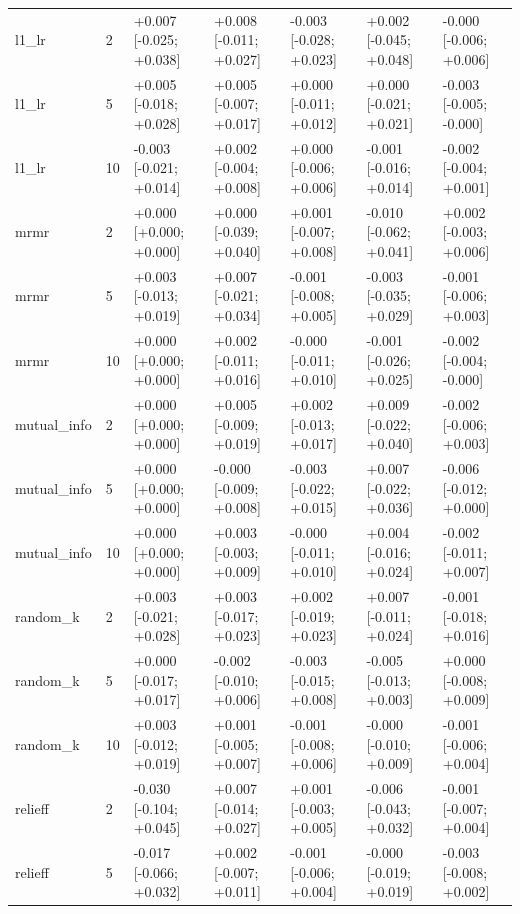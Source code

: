 \begin{table}[t]
\begin{tabular}{lllllll}
    l1\_lr & 2 & +0.007 [-0.025; +0.038] & +0.008 [-0.011; +0.027] & -0.003 [-0.028; +0.023] & +0.002 [-0.045; +0.048] & -0.000 [-0.006; +0.006] \\
    l1\_lr & 5 & +0.005 [-0.018; +0.028] & +0.005 [-0.007; +0.017] & +0.000 [-0.011; +0.012] & +0.000 [-0.021; +0.021] & -0.003 [-0.005; -0.000] \\
    l1\_lr & 10 & -0.003 [-0.021; +0.014] & +0.002 [-0.004; +0.008] & +0.000 [-0.006; +0.006] & -0.001 [-0.016; +0.014] & -0.002 [-0.004; +0.001] \\
    mrmr & 2 & +0.000 [+0.000; +0.000] & +0.000 [-0.039; +0.040] & +0.001 [-0.007; +0.008] & -0.010 [-0.062; +0.041] & +0.002 [-0.003; +0.006] \\
    mrmr & 5 & +0.003 [-0.013; +0.019] & +0.007 [-0.021; +0.034] & -0.001 [-0.008; +0.005] & -0.003 [-0.035; +0.029] & -0.001 [-0.006; +0.003] \\
    mrmr & 10 & +0.000 [+0.000; +0.000] & +0.002 [-0.011; +0.016] & -0.000 [-0.011; +0.010] & -0.001 [-0.026; +0.025] & -0.002 [-0.004; -0.000] \\
    mutual\_info & 2 & +0.000 [+0.000; +0.000] & +0.005 [-0.009; +0.019] & +0.002 [-0.013; +0.017] & +0.009 [-0.022; +0.040] & -0.002 [-0.006; +0.003] \\
    mutual\_info & 5 & +0.000 [+0.000; +0.000] & -0.000 [-0.009; +0.008] & -0.003 [-0.022; +0.015] & +0.007 [-0.022; +0.036] & -0.006 [-0.012; +0.000] \\
    mutual\_info & 10 & +0.000 [+0.000; +0.000] & +0.003 [-0.003; +0.009] & -0.000 [-0.011; +0.010] & +0.004 [-0.016; +0.024] & -0.002 [-0.011; +0.007] \\
    random\_k & 2 & +0.003 [-0.021; +0.028] & +0.003 [-0.017; +0.023] & +0.002 [-0.019; +0.023] & +0.007 [-0.011; +0.024] & -0.001 [-0.018; +0.016] \\
    random\_k & 5 & +0.000 [-0.017; +0.017] & -0.002 [-0.010; +0.006] & -0.003 [-0.015; +0.008] & -0.005 [-0.013; +0.003] & +0.000 [-0.008; +0.009] \\
    random\_k & 10 & +0.003 [-0.012; +0.019] & +0.001 [-0.005; +0.007] & -0.001 [-0.008; +0.006] & -0.000 [-0.010; +0.009] & -0.001 [-0.006; +0.004] \\
    relieff & 2 & -0.030 [-0.104; +0.045] & +0.007 [-0.014; +0.027] & +0.001 [-0.003; +0.005] & -0.006 [-0.043; +0.032] & -0.001 [-0.007; +0.004] \\
    relieff & 5 & -0.017 [-0.066; +0.032] & +0.002 [-0.007; +0.011] & -0.001 [-0.006; +0.004] & -0.000 [-0.019; +0.019] & -0.003 [-0.008; +0.002] \\

\end{tabular}
\end{table}
